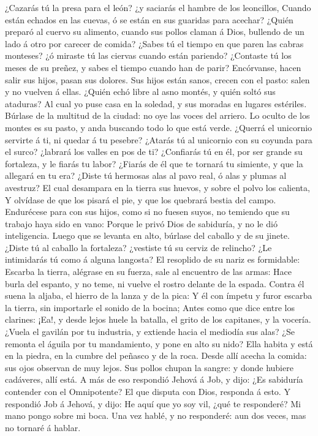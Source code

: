  ¿Cazarás tú la presa para el león? ¿y saciarás el hambre
de los leoncillos,  Cuando están echados en las cuevas, ó
se están en sus guaridas para acechar?  ¿Quién preparó al
cuervo su alimento, cuando sus pollos claman á Dios, bullendo de un lado
á otro por carecer de comida?  ¿Sabes tú el tiempo en que
paren las cabras monteses? ¿ó miraste tú las ciervas cuando están
pariendo?  ¿Contaste tú los meses de su preñez, y sabes el
tiempo cuando han de parir?  Encórvanse, hacen salir sus
hijos, pasan sus dolores.  Sus hijos están sanos, crecen
con el pasto: salen y no vuelven á ellas.  ¿Quién echó
libre al asno montés, y quién soltó sus ataduras?  Al cual
yo puse casa en la soledad, y sus moradas en lugares estériles.
 Búrlase de la multitud de la ciudad: no oye las voces
del arriero.  Lo oculto de los montes es su pasto, y anda
buscando todo lo que está verde.  ¿Querrá el unicornio
servirte á ti, ni quedar á tu pesebre?  ¿Atarás tú al
unicornio con su coyunda para el surco? ¿labrará los valles en pos de
ti?  ¿Confiarás tú en él, por ser grande su fortaleza, y
le fiarás tu labor?  ¿Fiarás de él que te tornará tu
simiente, y que la allegará en tu era?  ¿Diste tú
hermosas alas al pavo real, ó alas y plumas al avestruz? 
El cual desampara en la tierra sus huevos, y sobre el polvo los
calienta,  Y olvídase de que los pisará el pie, y que los
quebrará bestia del campo.  Endurécese para con sus
hijos, como si no fuesen suyos, no temiendo que su trabajo haya sido en
vano:  Porque le privó Dios de sabiduría, y no le dió
inteligencia.  Luego que se levanta en alto, búrlase del
caballo y de su jinete.  ¿Diste tú al caballo la
fortaleza? ¿vestiste tú su cerviz de relincho?  ¿Le
intimidarás tú como á alguna langosta? El resoplido de su nariz es
formidable:  Escarba la tierra, alégrase en su fuerza,
sale al encuentro de las armas:  Hace burla del espanto,
y no teme, ni vuelve el rostro delante de la espada. 
Contra él suena la aljaba, el hierro de la lanza y de la pica:
 Y él con ímpetu y furor escarba la tierra, sin
importarle el sonido de la bocina;  Antes como que dice
entre los clarines: ¡Ea!, y desde lejos huele la batalla, el grito de
los capitanes, y la vocería.  ¿Vuela el gavilán por tu
industria, y extiende hacia el mediodía sus alas?  ¿Se
remonta el águila por tu mandamiento, y pone en alto su nido? Ella
habita y está en la piedra, en la cumbre del peñasco y de la roca. Desde
allí acecha la comida: sus ojos observan de muy lejos. Sus pollos chupan
la sangre: y donde hubiere cadáveres, allí está. A más de eso respondió
Jehová á Job, y dijo: ¿Es sabiduría contender con el Omnipotente? El que
disputa con Dios, responda á esto. Y respondió Job á Jehová, y dijo: He
aquí que yo soy vil, ¿qué te responderé? Mi mano pongo sobre mi boca.
Una vez hablé, y no responderé: aun dos veces, mas no tornaré á hablar.

